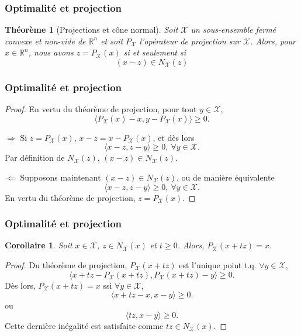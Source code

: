 \documentclass[t,usepdftitle=false]{beamer}
\newtheorem{thm}{Théorème}
\newtheorem{coro}{Corollaire}
\def\cX{\mathcal{X}}
\begin{document}
\begin{frame}
\frametitle{Optimalité et projection}

\begin{thm}[Projections et cône normal]
Soit $\cX$ un sous-ensemble fermé convexe et non-vide de $\mathbb{R}^n$ et soit $P_{\cX}$ l'opérateur de projection sur $\cX$.
Alors, pour $x \in \mathbb{R}^n$, nous avons $z = P_{\cX}(x)$ si et seulement si
$$
(x-z) \in N_{\cX}(z)
$$
\end{thm}

\end{frame}

\begin{frame}
\frametitle{Optimalité et projection}

\begin{proof}
En vertu du théorème de projection, pour tout $y \in \cX$,
$$
\langle P_{\cX}(x)-x, y-P_{\cX}(x) \rangle \geq 0.
$$

$\boxed{\Rightarrow}$ Si $z = P_{\cX}(x)$, $x-z = x - P_{\cX}(x)$, et dès lors
$$
\langle x-z, z-y \rangle \geq 0,\ \forall y \in \cX.
$$
Par définition de $N_{\cX}(z)$, $(x-z) \in N_{\cX}(z)$.

\mbox{}

$\boxed{\Leftarrow}$ Supposons maintenant $(x-z) \in N_{\cX}(z)$, ou de manière équivalente
$$
\langle x-z, z-y \rangle \geq 0,\ \forall y \in \cX.
$$
En vertu du théorème de projection, $z = P_{\cX}(x)$.
\end{proof}

\end{frame}

\begin{frame}
\frametitle{Optimalité et projection}

\begin{coro}
Soit $x \in \cX$, $z \in N_{\cX}(x)$ et $t \geq 0$. Alors, $P_{\cX}(x + tz) = x$.
\end{coro}



\begin{proof}
Du théorème de projection, $P_{\cX}(x + tz)$ est l'unique point t.q. $\forall y \in \cX$,
$$
\langle x + tz - P_{\cX}(x + tz), P_{\cX}(x + tz) - y \rangle \geq 0.
$$
Dès lors, $P_{\cX}(x + tz) = x$ ssi $\forall y \in \cX$,
$$
\langle x + tz - x, x - y \rangle \geq 0.
$$
ou
$$
\langle tz, x - y \rangle \geq 0.
$$
Cette dernière inégalité est satisfaite comme $tz \in N_{\cX}(x)$.
\end{proof}

\end{frame}
\end{document}
